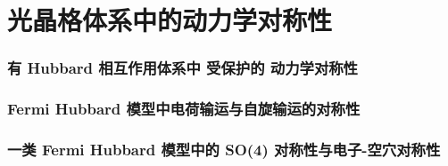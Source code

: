 \chapter{光晶格体系中的动力学对称性}


\subsection{有 Hubbard 相互作用体系中 受保护的 动力学对称性}



\subsection{Fermi Hubbard 模型中电荷输运与自旋输运的对称性}


\subsection{一类 Fermi Hubbard 模型中的 SO(4) 对称性与电子-空穴对称性}